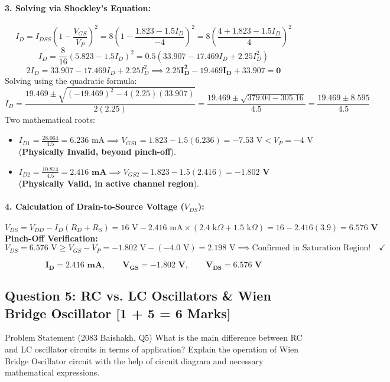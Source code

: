 \documentclass[11pt,a4paper,oneside]{book}
\begin{document}
\paragraph{3. Solving via Shockley's Equation:}
\[
I_D = I_{DSS} \left(1 - \frac{V_{GS}}{V_P}\right)^2 = 8 \left(1 - \frac{1.823 - 1.5 I_D}{-4}\right)^2 = 8 \left(\frac{4 + 1.823 - 1.5 I_D}{4}\right)^2
\]
\[
I_D = \frac{8}{16} (5.823 - 1.5 I_D)^2 = 0.5 \left(33.907 - 17.469 I_D + 2.25 I_D^2\right)
\]
\[
2 I_D = 33.907 - 17.469 I_D + 2.25 I_D^2 \implies \mathbf{2.25 I_D^2 - 19.469 I_D + 33.907 = 0}
\]
Solving using the quadratic formula:
\[
I_D = \frac{19.469 \pm \sqrt{(-19.469)^2 - 4(2.25)(33.907)}}{2(2.25)} = \frac{19.469 \pm \sqrt{379.04 - 305.16}}{4.5} = \frac{19.469 \pm 8.595}{4.5}
\]
Two mathematical roots:
\begin{itemize}[leftmargin=1.5em]
  \item $I_{D1} = \frac{28.064}{4.5} = 6.236\text{ mA} \implies V_{GS1} = 1.823 - 1.5(6.236) = -7.53\text{ V} < V_P = -4\text{ V}$ (\textbf{Physically Invalid, beyond pinch-off}).
  \item $I_{D2} = \frac{10.874}{4.5} = \mathbf{2.416\text{ mA}} \implies V_{GS2} = 1.823 - 1.5(2.416) = \mathbf{-1.802\text{ V}}$ (\textbf{Physically Valid, in active channel region}).
\end{itemize}

\paragraph{4. Calculation of Drain-to-Source Voltage ($V_{DS}$):}
\[
V_{DS} = V_{DD} - I_D(R_D + R_S) = 16\text{ V} - 2.416\text{ mA} \times (2.4\text{ k}\Omega + 1.5\text{ k}\Omega) = 16 - 2.416(3.9) = \mathbf{6.576\text{ V}}
\]
\textbf{Pinch-Off Verification:}
\[
V_{DS} = 6.576\text{ V} \ge V_{GS} - V_P = -1.802\text{ V} - (-4.0\text{ V}) = 2.198\text{ V} \implies \text{Confirmed in Saturation Region!} \quad \checkmark
\]

\begin{answerbox}
$$\mathbf{I_D = 2.416\text{ mA}, \qquad V_{GS} = -1.802\text{ V}, \qquad V_{DS} = 6.576\text{ V}}$$
\end{answerbox}

\vspace{0.6cm}

\subsection{Question 5: RC vs. LC Oscillators \& Wien Bridge Oscillator [1 + 5 = 6 Marks]}
\begin{questionbox}{Problem Statement (2083 Baishakh, Q5)}
What is the main difference between RC and LC oscillator circuits in terms of application? Explain the operation of Wien Bridge Oscillator circuit with the help of circuit diagram and necessary mathematical expressions.
\end{questionbox}
\end{document}
